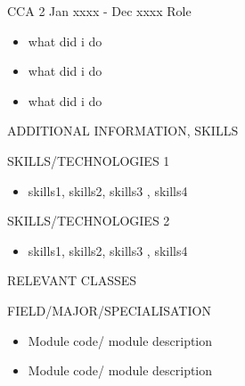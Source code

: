 \documentclass[11pt]{article}
\begin{document}
\begin{body2}
{CCA 2}
{Jan xxxx - Dec xxxx}
{Role}

\noindent \begin{minipage}{16cm}
\begin{itemize}[leftmargin=*]
	\item what did i do
	\item what did i do
	\item what did i do
\end{itemize}
\end{minipage}
\end{body2}



\begin{SectionHeaders}{ADDITIONAL INFORMATION, SKILLS}
\end{SectionHeaders}


\begin{body3}
{SKILLS/TECHNOLOGIES 1}

\noindent \begin{minipage}{16cm}
\begin{itemize}[leftmargin=*]
	\item skills1, skills2, skills3 , skills4
\end{itemize}
\end{minipage}
\end{body3}


\begin{body3}
{SKILLS/TECHNOLOGIES 2}

\noindent \begin{minipage}{16cm}
\begin{itemize}[leftmargin=*]
	\item skills1, skills2, skills3 , skills4
\end{itemize}
\end{minipage}
\end{body3}



\begin{SectionHeaders}{RELEVANT CLASSES}
\end{SectionHeaders}

\begin{body3}
{FIELD/MAJOR/SPECIALISATION}

\noindent \begin{minipage}{16cm}
\begin{itemize}[leftmargin=*]
	\item Module code/ module description
	\item Module code/ module description
\end{itemize}
\end{minipage}
\end{body3}
\end{document}
